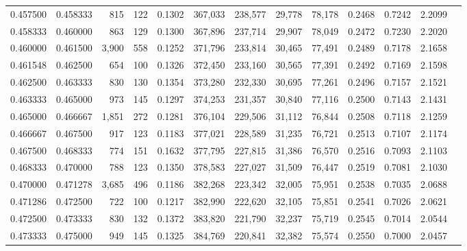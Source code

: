 \begin{tabular}{rrrrrrrrrrrrr}
0.457500 & 0.458333 &   815 & 122 &                                     0.1302 & 367,033 & 238,577 &  29,778 &  78,178 & 0.2468 & 0.7242 & 2.2099 \\
0.458333 & 0.460000 &   863 & 129 &                                     0.1300 & 367,896 & 237,714 &  29,907 &  78,049 & 0.2472 & 0.7230 & 2.2020 \\
0.460000 & 0.461500 & 3,900 & 558 &                                     0.1252 & 371,796 & 233,814 &  30,465 &  77,491 & 0.2489 & 0.7178 & 2.1658 \\
0.461548 & 0.462500 &   654 & 100 &                                     0.1326 & 372,450 & 233,160 &  30,565 &  77,391 & 0.2492 & 0.7169 & 2.1598 \\
0.462500 & 0.463333 &   830 & 130 &                                     0.1354 & 373,280 & 232,330 &  30,695 &  77,261 & 0.2496 & 0.7157 & 2.1521 \\
0.463333 & 0.465000 &   973 & 145 &                                     0.1297 & 374,253 & 231,357 &  30,840 &  77,116 & 0.2500 & 0.7143 & 2.1431 \\
0.465000 & 0.466667 & 1,851 & 272 &                                     0.1281 & 376,104 & 229,506 &  31,112 &  76,844 & 0.2508 & 0.7118 & 2.1259 \\
0.466667 & 0.467500 &   917 & 123 &                                     0.1183 & 377,021 & 228,589 &  31,235 &  76,721 & 0.2513 & 0.7107 & 2.1174 \\
0.467500 & 0.468333 &   774 & 151 &                                     0.1632 & 377,795 & 227,815 &  31,386 &  76,570 & 0.2516 & 0.7093 & 2.1103 \\
0.468333 & 0.470000 &   788 & 123 &                                     0.1350 & 378,583 & 227,027 &  31,509 &  76,447 & 0.2519 & 0.7081 & 2.1030 \\
0.470000 & 0.471278 & 3,685 & 496 &                                     0.1186 & 382,268 & 223,342 &  32,005 &  75,951 & 0.2538 & 0.7035 & 2.0688 \\
0.471286 & 0.472500 &   722 & 100 &                                     0.1217 & 382,990 & 222,620 &  32,105 &  75,851 & 0.2541 & 0.7026 & 2.0621 \\
0.472500 & 0.473333 &   830 & 132 &                                     0.1372 & 383,820 & 221,790 &  32,237 &  75,719 & 0.2545 & 0.7014 & 2.0544 \\
0.473333 & 0.475000 &   949 & 145 &                                     0.1325 & 384,769 & 220,841 &  32,382 &  75,574 & 0.2550 & 0.7000 & 2.0457 \\

\end{tabular}
